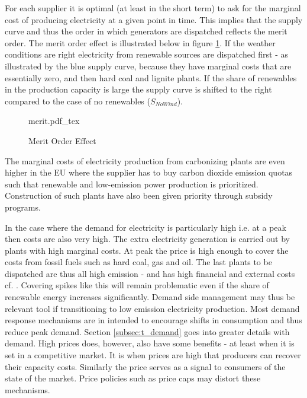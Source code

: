 For each supplier it is optimal (at least in the short term) to ask for the marginal cost of producing electricity at a given point in time. This implies that the supply curve and thus the order in which generators are dispatched reflects the merit order. The merit order effect is illustrated below in figure \ref{fig:merit}. If the weather conditions are right electricity from renewable sources are dispatched first - as illustrated by the blue supply curve, because they have marginal costs that are essentially zero, and then hard coal and lignite plants. If the share of renewables in the production capacity is large the supply curve is shifted to the right compared to the case of no renewables ($S_{NoWind}$).
\medskip 
\begin{figure}[H]
    \centering
    \caption{Merit Order Effect}
    \label{fig:merit}
    \center
        \def\svgwidth{0.9\textwidth}
        {merit.pdf_tex}
\end{figure}

\noindent The marginal costs of electricity production from carbonizing plants are even higher in the EU where the supplier has to buy carbon dioxide emission quotas such that renewable and low-emission power production is prioritized. Construction of such plants have also been given priority through subsidy programs. 
\medskip

In the case where the demand for electricity is particularly high i.e. at a peak then costs are also very high. The extra electricity generation is carried out by plants with high marginal costs. At peak the price is high enough to cover the costs from fossil fuels such as hard coal, gas and oil. The last plants to be dispatched are thus all high emission - and has high financial and external costs cf. \cite{zweifel2017energy}. Covering spikes like this will remain problematic even if the share of renewable energy increases significantly. Demand side management may thus be relevant tool if transitioning to low emission electricity production. Most demand response mechanisms are in intended to encourage shifts in consumption and thus reduce peak demand. Section \ref{subsec:t_demand} goes into greater details with demand. High prices does, however, also have some benefits - at least when it is set in a competitive market. It is when prices are high that producers can recover their capacity costs. Similarly the price serves as a signal to consumers of the state of the market. Price policies such as price caps may distort these mechanisms. 

